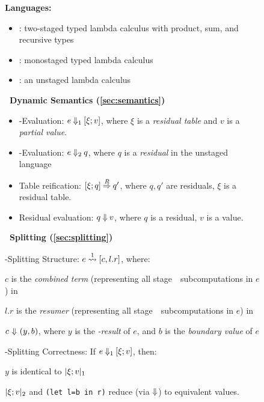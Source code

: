 \begin{figure*}
\textbf{Languages:}
\begin{itemize}
\item \lang: two-staged typed lambda calculus with product, sum, and
  recursive types
\item \langTwo: monostaged typed lambda calculus
\item \langmono: an unstaged lambda calculus
\end{itemize}

\textbf{\lang\ Dynamic Semantics (\ref{sec:semantics})}
\begin{itemize}
\item 
\bbone-Evaluation: $e\mathbin{{\Downarrow_{ 1}}}[\xi;v]$, where $\xi$ is a \emph{residual table} and $v$ is a \emph{partial value}. 

\item
\bbtwo-Evaluation: $e\mathbin{{\Downarrow_{ 2}}}q$, where $q$ is a \emph{residual} in the unstaged language \langTwo

\item 
Table reification: $[\xi;q]\mathbin{\overset{R}\Rightarrow} q'$, where $q,q'$ are residuals,
$\xi$ is a residual table.

\item
Residual evaluation: $q\mathbin{{\Downarrow}} v$, where $q$ is a residual, $v$ is a
value.
\end{itemize}

\textbf{\lang\ Splitting (\ref{sec:splitting})}

\hspace{2em}\bbone-Splitting Structure: $e \overset{ 1}\rightsquigarrow [c,l.r]$, where:

\hspace{4em}$c$ is the \emph{combined term}
(representing all stage~\bbone\ subcomputations in $e$)
in \langmono

\hspace{4em}$l.r$ is the \emph{resumer}
(representing all stage~\bbtwo\ subcomputations in $e$)
in \langmono

\hspace{4em}$c~{\Downarrow}~(y,b)$, where 
$y$ is the \emph{\bbone-result} of $e$, and
$b$ is the \emph{boundary value} of $e$

\hspace{2em}\bbone-Splitting Correctness: If $e\mathbin{{\Downarrow_{ 1}}}[\xi;v]$, then:

\hspace{4em}$y$ is identical to $|\xi;v|_{ 1}$

\hspace{4em}$|\xi;v|_{ 2}$ and \texttt{(let l=b in r)} 
reduce (via ${\Downarrow}$) to equivalent values.  


\end{figure*}
